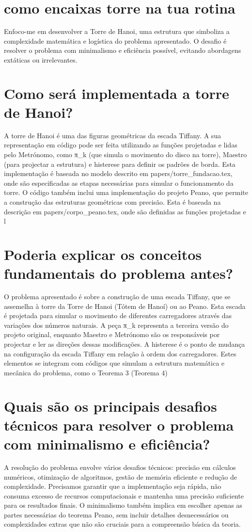 \documentclass[11pt,a4paper]{article}
\begin{document}
\section{como encaixas torre na tua rotina}
Enfoco-me em desenvolver a Torre de Hanoi, uma estrutura que simboliza a complexidade matemática e logística do problema apresentado. O desafio é resolver o problema com minimalismo e eficiência possível, evitando abordagens extáticas ou irrelevantes.

\section{Como será implementada a torre de Hanoi?}
A torre de Hanoi é uma das figuras geométricas da escada Tiffany. A sua representação em código pode ser feita utilizando as funções projetadas e lidas pelo Metrónomo, como π\_k (que simula o movimento do disco na torre), Maestro (para projectar a estrutura) e histerese para definir os padrões de borda. Esta implementação é baseada no modelo descrito em papers/torre\_fundacao.tex, onde são especificadas as etapas necessárias para simular o funcionamento da torre. O código também inclui uma implementação do projeto Peano, que permite a construção das estruturas geométricas com precisão. Esta é baseada na descrição em papers/corpo\_peano.tex, onde são definidas as funções projetadas e l

\section{Poderia explicar os conceitos fundamentais do problema antes?}
O problema apresentado é sobre a construção de uma escada Tiffany, que se assemelha à torre da Torre de Hanoi (Tótem de Hanoí) ou ao Peano. Esta escada é projetada para simular o movimento de diferentes carregadores através das variações dos números naturais. A peça π\_k representa a terceira versão do projeto original, enquanto Maestro e Metrónomo são os responsáveis por projectar e ler as direções dessas modificações. A histerese é o ponto de mudança na configuração da escada Tiffany em relação à ordem dos carregadores. Estes elementos se integram com códigos que simulam a estrutura matemática e mecânica do problema, como o Teorema 3 (Teorema 4)

\section{Quais são os principais desafios técnicos para resolver o problema com minimalismo e eficiência?}
A resolução do problema envolve vários desafios técnicos: precisão em cálculos numéricos, otimização de algoritmos, gestão de memória eficiente e redução de complexidade. Precisamos garantir que a implementação seja rápida, não consuma excesso de recursos computacionais e mantenha uma precisão suficiente para os resultados finais. O minimalismo também implica em escolher apenas as partes necessárias do teorema Peano, sem incluir detalhes desnecessários ou complexidades extras que não são cruciais para a compreensão básica da teoria.
\end{document}
